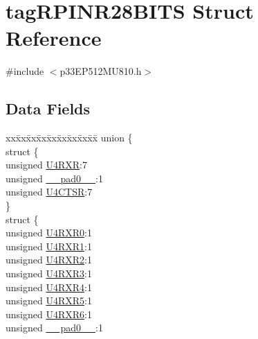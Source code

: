 \hypertarget{structtag_r_p_i_n_r28_b_i_t_s}{}\section{tag\+R\+P\+I\+N\+R28\+B\+I\+TS Struct Reference}
\label{structtag_r_p_i_n_r28_b_i_t_s}


{\ttfamily \#include $<$p33\+E\+P512\+M\+U810.\+h$>$}

\subsection*{Data Fields}
\begin{DoxyCompactItemize}
\item 
\begin{tabbing}
xx\=xx\=xx\=xx\=xx\=xx\=xx\=xx\=xx\=\kill
union \{\\
\>struct \{\\
\>\>unsigned \hyperlink{structtag_r_p_i_n_r28_b_i_t_s_afd5a6d4706c349d4b5afc1ad43599dbc}{U4RXR}:7\\
\>\>unsigned \hyperlink{structtag_r_p_i_n_r28_b_i_t_s_adf71f3d8410c1f1dbbc96680a92c49af}{\_\_pad0\_\_}:1\\
\>\>unsigned \hyperlink{structtag_r_p_i_n_r28_b_i_t_s_ab6d2e6f0944babf62cdb99763ca228ff}{U4CTSR}:7\\
\>\} \\
\>struct \{\\
\>\>unsigned \hyperlink{structtag_r_p_i_n_r28_b_i_t_s_a466d2b7985d28d8bf099a258578efb3b}{U4RXR0}:1\\
\>\>unsigned \hyperlink{structtag_r_p_i_n_r28_b_i_t_s_a423f23d635d4f536a04367555158a5d5}{U4RXR1}:1\\
\>\>unsigned \hyperlink{structtag_r_p_i_n_r28_b_i_t_s_aad02368917c63afa5891b24308c7c1b6}{U4RXR2}:1\\
\>\>unsigned \hyperlink{structtag_r_p_i_n_r28_b_i_t_s_a70910937032acb35a3fbd33fe323c240}{U4RXR3}:1\\
\>\>unsigned \hyperlink{structtag_r_p_i_n_r28_b_i_t_s_a379b3c16d684e6a9247757da46b0e7d3}{U4RXR4}:1\\
\>\>unsigned \hyperlink{structtag_r_p_i_n_r28_b_i_t_s_a7c59af666f690f986ad5bbf29cca3dfa}{U4RXR5}:1\\
\>\>unsigned \hyperlink{structtag_r_p_i_n_r28_b_i_t_s_a950f9ebc01abf2b51c0da8efc6d4e8fa}{U4RXR6}:1\\
\>\>unsigned \hyperlink{structtag_r_p_i_n_r28_b_i_t_s_adf71f3d8410c1f1dbbc96680a92c49af}{\_\_pad0\_\_}:1\\

\end{tabbing}
\end{DoxyCompactItemize}
